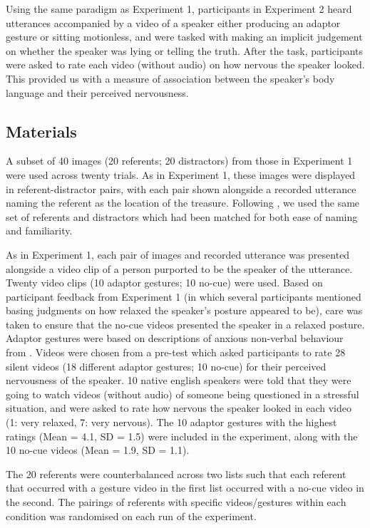 \documentclass[a4paper,man,natbib]{apa6}
\begin{document}
Using the same paradigm as Experiment 1, participants in Experiment 2 heard utterances accompanied by a video of a speaker either producing an adaptor gesture or sitting motionless, and were tasked with making an implicit judgement on whether the speaker was lying or telling the truth. 
After the task, participants were asked to rate each video (without audio) on how nervous the speaker looked.
This provided us with a measure of association between the speaker's body language and their perceived nervousness.

\subsection{Materials}
A subset of 40 images (20 referents; 20 distractors) from those in Experiment 1 were used across twenty trials.
As in Experiment 1, these images were displayed in referent-distractor pairs, with each pair shown alongside a recorded utterance naming the referent as the location of the treasure.
Following \citet{Loy2017}, we used the same set of referents and distractors which had been matched for both ease of naming and familiarity.


As in Experiment 1, each pair of images and recorded utterance was presented alongside a video clip of a person purported to be the speaker of the utterance.
Twenty video clips (10 adaptor gestures; 10 no-cue) were used. 
Based on participant feedback from Experiment 1 (in which several participants mentioned basing judgments on how relaxed the speaker's posture appeared to be), care was taken to ensure that the no-cue videos presented the speaker in a relaxed posture. 
Adaptor gestures were based on descriptions of anxious non-verbal behaviour from \citet{Gregersen2005}.
Videos were chosen from a pre-test which asked participants to rate 28 silent videos (18 different adaptor gestures; 10 no-cue) for their perceived nervousness of the speaker. 
10 native english speakers were told that they were going to watch videos (without audio) of someone being questioned in a stressful situation, and were asked to rate how nervous the speaker looked in each video (1: very relaxed, 7: very nervous). 
The 10 adaptor gestures with the highest ratings (Mean = 4.1, SD = 1.5) were included in the experiment, along with the 10 no-cue videos (Mean = 1.9, SD = 1.1).

The 20 referents were counterbalanced across two lists such that each referent that occurred with a gesture video in the first list occurred with a no-cue video in the second.
The pairings of referents with specific videos/gestures within each condition was randomised on each run of the experiment.
\end{document}

